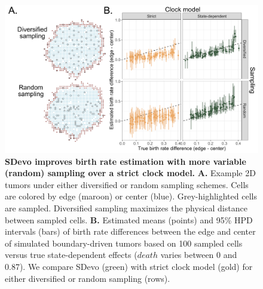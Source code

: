 \documentclass[12pt]{elife_based}
\begin{document}
\begin{figure}
\includegraphics[width=\textwidth]{figures/figure_4_supp_random_sampling.pdf}
\caption{\textbf{SDevo improves birth rate estimation with more variable (random) sampling over a strict clock model.} \textbf{A.} Example 2D tumors under either diversified or random sampling schemes. Cells are colored by edge (maroon) or center (blue). Grey-highlighted cells are sampled. Diversified sampling maximizes the physical distance between sampled cells. \textbf{B.} Estimated means (points) and 95\% HPD intervals (bars) of birth rate differences between the edge and center of simulated boundary-driven tumors based on 100 sampled cells versus true state-dependent effects ($death$ varies between 0 and 0.87). We compare SDevo (green) with strict clock model (gold) for either diversified or random sampling (rows).}
\label{figsupp:sf4}
\end{figure} 
\end{document}
